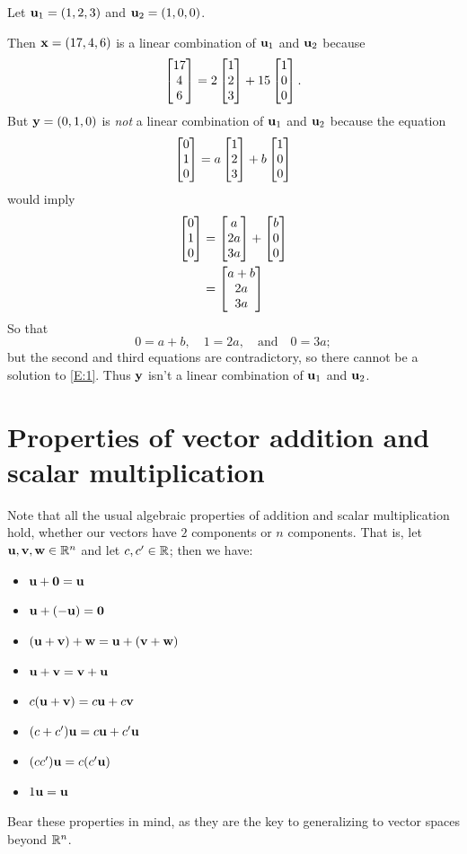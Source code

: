 \begin{myexample}
Let $\mathbf{u}_1 = (1,2,3)$ and $\mathbf{u}_2 = (1,0,0)$.  

Then $\mathbf{x} = (17,4,6)$ is a linear combination of $\mathbf{u}_1$
and $\mathbf{u}_2$ because
$$
\left[ \begin{matrix} 17\\4\\6 \end{matrix} \right] = 2 \left[ \begin{matrix} 1\\2\\3 \end{matrix} \right] + 15 \left[ \begin{matrix} 1\\0\\0 \end{matrix} \right].
$$
But $\mathbf{y} = (0,1,0)$ is \emph{not} a linear combination of
$\mathbf{u}_1$ and $\mathbf{u}_2$ because the equation
\begin{equation} \label{E:1}
\left[ \begin{matrix} 0\\1\\0 \end{matrix} \right] = a \left[ \begin{matrix} 1\\2\\3 \end{matrix} \right] + b\left[ \begin{matrix} 1\\0\\0 \end{matrix} \right]
\end{equation}
would imply 
\begin{align*}
\left[ \begin{matrix} 0\\1\\0 \end{matrix} \right] &= \left[ \begin{matrix} a\\2a\\3a \end{matrix} \right] + \left[ \begin{matrix} b\\0\\0 \end{matrix} \right]\\
&= \left[ \begin{matrix} a+b\\ 2a \\ 3a \end{matrix} \right]
\end{align*}
So that
$$
0 = a+b, \quad  1 = 2a, \quad \text{and} \quad 0 = 3a;
$$ 
but the second and third equations are contradictory, so
there cannot be a solution to \eqref{E:1}.  Thus $\mathbf{y}$
isn't a linear combination of $\mathbf{u}_1$ and $\mathbf{u}_2$.
\end{myexample}

\section{Properties of vector addition and scalar multiplication}



Note that all the usual algebraic properties of addition and
scalar multiplication hold, whether our vectors have $2$
components or $n$ components.  That is, let $\mathbf{u},\mathbf{v},\mathbf{w}\in\mathbb{R}^n$
and let $c,c' \in \mathbb{R}$; then we have:
\begin{itemize}
\item $\mathbf{u}+\mathbf{0} = \mathbf{u}$
\item $\mathbf{u} + (-\mathbf{u}) = \mathbf{0}$
\item $(\mathbf{u} + \mathbf{v}) + \mathbf{w} = \mathbf{u} + (\mathbf{v}+\mathbf{w})$

\item $\mathbf{u}+\mathbf{v} = \mathbf{v}+\mathbf{u}$
\item $c(\mathbf{u}+\mathbf{v}) = c\mathbf{u} + c\mathbf{v}$
\item $(c+c')\mathbf{u} = c\mathbf{u} + c'\mathbf{u}$
\item $(cc')\mathbf{u} = c(c'\mathbf{u})$
\item $1 \mathbf{u} = \mathbf{u}$
\end{itemize}
Bear these properties in mind, as they are the key to generalizing
to vector spaces beyond $\mathbb{R}^n$.

